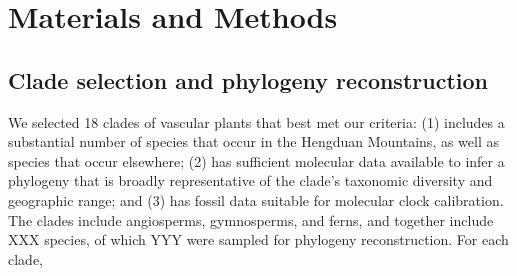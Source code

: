 \section{Materials and Methods}

\subsection{Clade selection and phylogeny reconstruction}

We selected 18 clades of vascular plants that best met our criteria: (1) includes a substantial number of species that occur in the Hengduan Mountains, as well as species that occur elsewhere; (2) has sufficient molecular data available to infer a phylogeny that is broadly representative of the clade's taxonomic diversity and geographic range; and (3) has fossil data suitable for molecular clock calibration. The clades include angiosperms, gymnosperms, and ferns, and together include XXX species, of which YYY were sampled for phylogeny reconstruction. For each clade, 